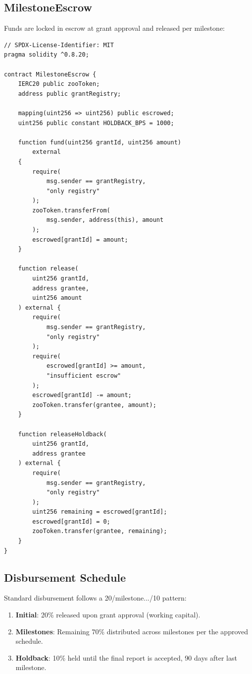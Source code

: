 \documentclass[11pt,letterpaper]{article}
\begin{document}
\subsection{MilestoneEscrow}

Funds are locked in escrow at grant approval and released per milestone:

\begin{lstlisting}[language=Solidity,caption=MilestoneEscrow contract]
// SPDX-License-Identifier: MIT
pragma solidity ^0.8.20;

contract MilestoneEscrow {
    IERC20 public zooToken;
    address public grantRegistry;

    mapping(uint256 => uint256) public escrowed;
    uint256 public constant HOLDBACK_BPS = 1000;

    function fund(uint256 grantId, uint256 amount)
        external
    {
        require(
            msg.sender == grantRegistry,
            "only registry"
        );
        zooToken.transferFrom(
            msg.sender, address(this), amount
        );
        escrowed[grantId] = amount;
    }

    function release(
        uint256 grantId,
        address grantee,
        uint256 amount
    ) external {
        require(
            msg.sender == grantRegistry,
            "only registry"
        );
        require(
            escrowed[grantId] >= amount,
            "insufficient escrow"
        );
        escrowed[grantId] -= amount;
        zooToken.transfer(grantee, amount);
    }

    function releaseHoldback(
        uint256 grantId,
        address grantee
    ) external {
        require(
            msg.sender == grantRegistry,
            "only registry"
        );
        uint256 remaining = escrowed[grantId];
        escrowed[grantId] = 0;
        zooToken.transfer(grantee, remaining);
    }
}
\end{lstlisting}

\subsection{Disbursement Schedule}

Standard disbursement follows a 20/milestone.../10 pattern:

\begin{enumerate}
    \item \textbf{Initial}: 20\% released upon grant approval (working capital).
    \item \textbf{Milestones}: Remaining 70\% distributed across milestones per the approved schedule.
    \item \textbf{Holdback}: 10\% held until the final report is accepted, 90 days after last milestone.
\end{enumerate}
\end{document}
